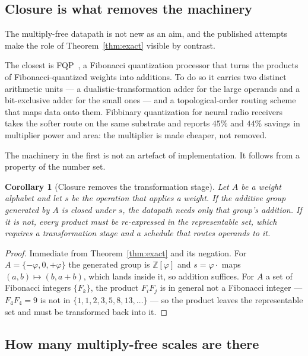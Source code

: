 \documentclass[11pt]{article}
\newtheorem{corollary}{Corollary}
\theoremstyle{definition}
\begin{document}
\subsection{Closure is what removes the machinery}\label{sec:closure}

The multiply-free datapath is not new as an aim, and the published attempts make
the role of Theorem~\ref{thm:exact} visible by contrast.

The closest is FQP~\cite{fqp}, a Fibonacci quantization processor that turns the
products of Fibonacci-quantized weights into additions. To do so it carries two
distinct arithmetic units --- a dualistic-transformation adder for the large
operands and a bit-exclusive adder for the small ones --- and a topological-order
routing scheme that maps data onto them. Fibbinary quantization for neural radio
receivers~\cite{fibbinary} takes the softer route on the same substrate and
reports $45\%$ and $44\%$ savings in multiplier power and area: the multiplier is
made cheaper, not removed.

The machinery in the first is not an artefact of implementation. It follows from
a property of the number set.

\begin{corollary}[Closure removes the transformation stage]\label{cor:closure}
Let $A$ be a weight alphabet and let $s$ be the operation that applies a weight.
If the additive group generated by $A$ is closed under $s$, the datapath needs
only that group's addition. If it is not, every product must be re-expressed in
the representable set, which requires a transformation stage and a schedule that
routes operands to it.
\end{corollary}
\begin{proof}
Immediate from Theorem~\ref{thm:exact} and its negation. For
$A=\{-\varphi,0,+\varphi\}$ the generated group is $\mathbb{Z}[\varphi]$ and
$s=\varphi\cdot$ maps $(a,b)\mapsto(b,a+b)$, which lands inside it, so addition
suffices. For $A$ a set of Fibonacci integers $\{F_k\}$, the product $F_iF_j$ is
in general not a Fibonacci integer --- $F_4F_4=9$ is not in
$\{1,1,2,3,5,8,13,\dots\}$ --- so the product leaves the representable set and
must be transformed back into it.
\end{proof}

\subsection{How many multiply-free scales are there}\label{sec:hierarchy}
\end{document}

